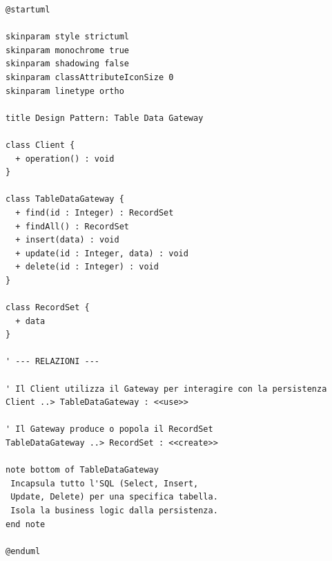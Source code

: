 \begin{verbatim}
@startuml

skinparam style strictuml
skinparam monochrome true
skinparam shadowing false
skinparam classAttributeIconSize 0
skinparam linetype ortho

title Design Pattern: Table Data Gateway

class Client {
  + operation() : void
}

class TableDataGateway {
  + find(id : Integer) : RecordSet
  + findAll() : RecordSet
  + insert(data) : void
  + update(id : Integer, data) : void
  + delete(id : Integer) : void
}

class RecordSet {
  + data
}

' --- RELAZIONI ---

' Il Client utilizza il Gateway per interagire con la persistenza
Client ..> TableDataGateway : <<use>>

' Il Gateway produce o popola il RecordSet
TableDataGateway ..> RecordSet : <<create>>

note bottom of TableDataGateway
 Incapsula tutto l'SQL (Select, Insert, 
 Update, Delete) per una specifica tabella.
 Isola la business logic dalla persistenza.
end note

@enduml

\end{verbatim}